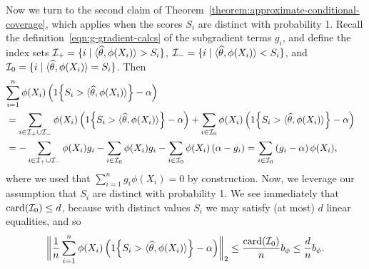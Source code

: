 \documentclass[11pt]{article}
\newcommand{\radphi}{b_{\phi}}
\newcommand{\scorerv}{S}
\begin{document}
Now we turn to the second claim of
Theorem~\ref{theorem:approximate-conditional-coverage}, which
applies when the scores $\scorerv_i$ are distinct with probability
1.
%
Recall the definition~\eqref{eqn:g-gradient-calcs} of the subgradient terms
$g_i$, and define the index sets $\mc{I}_+ = \{i \mid \<\what{\theta},
\phi(X_i)\> > \scorerv_i\}$, $\mc{I}_- = \{i \mid \<\what{\theta},
\phi(X_i)\> < \scorerv_i\}$, and $\mc{I}_0 = \{i \mid \<\what{\theta},
\phi(X_i)\> = \scorerv_i\}$.
%
Then
\begin{align*}
  \lefteqn{\sum_{i = 1}^n \phi(X_i)
    \left(\indic{\scorerv_i > \<\what{\theta}, \phi(X_i)\>}
    - \alpha\right)} \\
  & =
  \sum_{i \in \mc{I}_+ \cup \mc{I}_-}
  \phi(X_i)
  \left(\indic{\scorerv_i > \<\what{\theta}, \phi(X_i)\>}
  - \alpha\right)
  + \sum_{i \in \mc{I}_0}
  \phi(X_i) \left(\indic{\scorerv_i > \<\what{\theta}, \phi(X_i)\>}
  - \alpha \right) \\
  & =
  - \sum_{i \in \mc{I}_+ \cup \mc{I}_-}
  \phi(X_i) g_i
  - \sum_{i \in \mc{I}_0} \phi(X_i) g_i
  - \sum_{i \in \mc{I}_0} \phi(X_i) \left(\alpha - g_i\right)
  = \sum_{i \in \mc{I}_0}
  \left(g_i - \alpha\right) \phi(X_i),
\end{align*}
where we used that $\sum_{i = 1}^n g_i \phi(X_i) = 0$ by construction.
%
Now, we leverage our assumption that $\scorerv_i$ are distinct with
probability 1.
%
We see immediately that $\mathop{\rm card}(\mathcal{I}_0) \le d$, because with
distinct values $\scorerv_i$ we may satisfy (at most) $d$ linear equalities,
and so
\begin{align*}
  \ltwobigg{\frac{1}{n} \sum_{i = 1}^n
    \phi(X_i) \left(
    \indic{\scorerv_i > \<\what{\theta}, \phi(X_i)\>} - \alpha
    \right)}
  \le \frac{\card(\mc{I}_0)}{n}
  \radphi
  \le \frac{d}{n} \radphi.
\end{align*}
\end{document}
